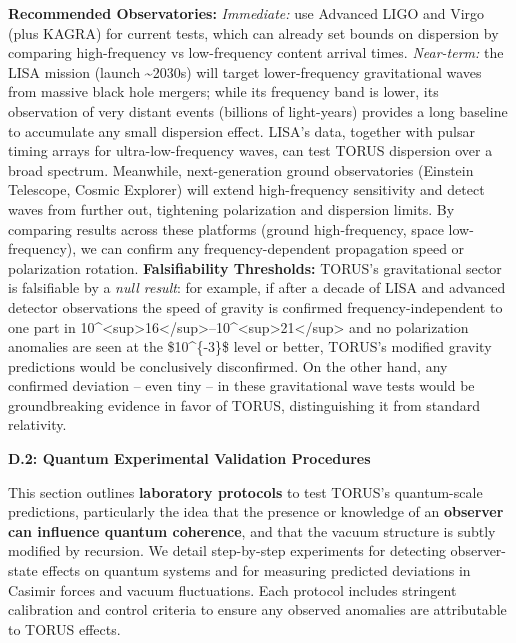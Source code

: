 \documentclass[
]{article}
\begin{document}
{\textbf{Recommended Observatories:} \emph{Immediate:} use Advanced LIGO
and Virgo (plus KAGRA) for current tests, which can already set bounds
on dispersion by comparing high-frequency vs low-frequency content
arrival times\hspace{0pt}. \emph{Near-term:} the LISA mission (launch
\textasciitilde2030s) will target lower-frequency gravitational waves
from massive black hole mergers; while its frequency band is lower, its
observation of very distant events (billions of light-years) provides a
long baseline to accumulate any small dispersion effect\hspace{0pt}.
LISA's data, together with pulsar timing arrays for ultra-low-frequency
waves, can test TORUS dispersion over a broad spectrum. Meanwhile,
next-generation ground observatories (Einstein Telescope, Cosmic
Explorer) will extend high-frequency sensitivity and detect waves from
further out, tightening polarization and dispersion limits. By comparing
results across these platforms (ground high-frequency, space
low-frequency), we can confirm any frequency-dependent propagation speed
or polarization rotation. \textbf{Falsifiability Thresholds:} TORUS's
gravitational sector is falsifiable by a \emph{null result}: for
example, if after a decade of LISA and advanced detector observations
the speed of gravity is confirmed frequency-independent to one part in
10\^{}\textless sup\textgreater16\textless/sup\textgreater--10\^{}\textless sup\textgreater21\textless/sup\textgreater{}
and no polarization anomalies are seen at the \$10\^{}\{-3\}\$ level or
better, TORUS's modified gravity predictions would be conclusively
disconfirmed\hspace{0pt}. On the other hand, any confirmed deviation --
even tiny -- in these gravitational wave tests would be groundbreaking
evidence in favor of TORUS, distinguishing it from standard relativity.

\textbf{D.2: Quantum Experimental Validation Procedures}

This section outlines \textbf{laboratory protocols} to test TORUS's
quantum-scale predictions, particularly the idea that the presence or
knowledge of an \textbf{observer can influence quantum coherence}, and
that the vacuum structure is subtly modified by recursion. We detail
step-by-step experiments for detecting observer-state effects on quantum
systems and for measuring predicted deviations in Casimir forces and
vacuum fluctuations. Each protocol includes stringent calibration and
control criteria to ensure any observed anomalies are attributable to
TORUS effects.

}
\end{document}
